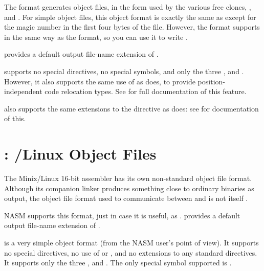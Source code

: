 The  format generates  object files, in the form
used by the various free  clones, , 
and . For simple object files, this object format is exactly
the same as  except for the magic number in the first four bytes
of the file. However, the  format supports
 in the same way as the
 format, so you can use it to write 
.

 provides a default output file-name extension of .

 supports no special directives, no special symbols, and
only the three  ,
 and . However, it also supports the same
use of  as  does, to provide position-independent
code relocation types. See  for full documentation
of this feature.

 also supports the same extensions to the 
directive as  does: see  for
documentation of this.

\section{: /Linux  Object Files}
\label{sec:as86fmt}

The Minix/Linux 16-bit assembler  has its own non-standard
object file format. Although its companion linker 
produces something close to ordinary  binaries as output,
the object file format used to communicate between  and
 is not itself .

NASM supports this format, just in case it is useful, as .
 provides a default output file-name extension of .

 is a very simple object format (from the NASM user's point
of view). It supports no special directives, no use of  or
, and no extensions to any standard directives. It supports
only the three  ,
 and . The only special symbol supported
is .
